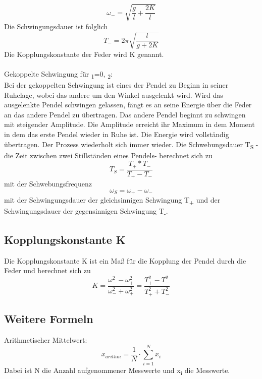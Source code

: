 \documentclass[titlepage=firstcover, captions=tableheading]{scrartcl}
\begin{document}
\begin{displaymath}
    \omega_-=\sqrt{\frac{g}{l}+\frac{2K}{l}}
\end{displaymath}
Die Schwingungsdauer ist folglich
\begin{displaymath}
    T_-=2\pi\sqrt{\frac{l}{g+2K}}
\end{displaymath}
Die Kopplungskonstante der Feder wird K genannt.
\\\\
Gekoppelte Schwingung für \alpha\textsubscript{1}=0, \alpha\textsubscript{2}:\\
Bei der gekoppelten Schwingung ist eines der Pendel zu Beginn in seiner Ruhelage, wobei das andere um den Winkel \alpha  ausgelenkt wird. Wird das ausgelenkte Pendel schwingen gelassen, fängt es an seine Energie über die Feder an das andere Pendel zu übertragen. Das andere Pendel beginnt zu schwingen mit steigender Amplitude. Die Amplitude erreicht ihr Maximum in dem Moment in dem das erste Pendel wieder in Ruhe ist. Die Energie wird vollständig übertragen. Der Prozess wiederholt sich immer wieder. Die Schwebungsdauer T\textsubscript{S} -die Zeit zwischen zwei Stillständen eines Pendels- berechnet sich zu 
\begin{displaymath}
    T_S=\frac{T_+*T_-}{T_+-T_-}
\end{displaymath}
mit der Schwebungsfrequenz
\begin{displaymath}
    \omega_S=\omega_+-\omega_-
\end{displaymath}
mit der Schwingungsdauer der gleichsinnigen Schwingung T\textsubscript{+} und der Schwingungsdauer der gegensinnigen Schwingung T\textsubscript{-}. \\
\subsection{Kopplungskonstante K}
\noindent Die Kopplungskonstante K ist ein Maß für die Kopplung der Pendel durch die Feder und berechnet sich zu 
\begin{displaymath}
    K=\frac{\omega_-^2-\omega_+^2}{\omega_-^2+\omega_+^2}=\frac{T_+^2-T_-^2}{T_+^2+T_-^2}
\end{displaymath}
\subsection{Weitere Formeln}
\noindent Arithmetischer Mittelwert:\\
\begin{equation} \label{Mittelwert}  
    x_{arithm}=\frac{1}{N}\cdot \sum \limits_{i=1}^{N}x_i
\end{equation}
Dabei ist N die Anzahl aufgenommener Messwerte und x\textsubscript{i} die Messwerte.
\end{document}
